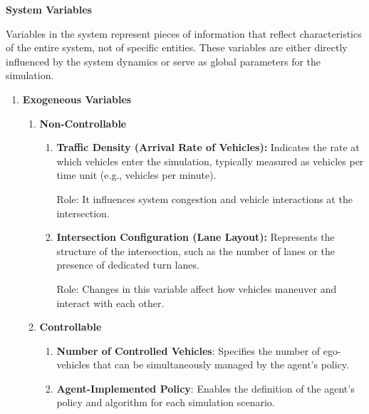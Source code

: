 \textbf{System Variables}

Variables in the system represent pieces of information that reflect characteristics of the entire system, not of specific entities. These variables are either directly influenced by the system dynamics or serve as global parameters for the simulation.

\begin{enumerate}

    \item \textbf{Exogeneous Variables}
    \begin{enumerate}
        \item\textbf{Non-Controllable}
            \begin{enumerate}
          
            \item \textbf{Traffic Density (Arrival Rate of Vehicles):}
                Indicates the rate at which vehicles enter the simulation, typically measured as vehicles per time unit (e.g., vehicles per minute).
                
                Role: It influences system congestion and vehicle interactions at the intersection.
                
            \item \textbf{Intersection Configuration (Lane Layout):}
                Represents the structure of the intersection, such as the number of lanes or the presence of dedicated turn lanes.
                
                Role: Changes in this variable affect how vehicles maneuver and interact with each other.
            \end{enumerate}  

        \item \textbf{Controllable}  
            \begin{enumerate}
                \item \textbf{Number of Controlled Vehicles}:  
                Specifies the number of ego-vehicles that can be simultaneously managed by the agent's policy.  

                \item \textbf{Agent-Implemented Policy}:  
                Enables the definition of the agent's policy and algorithm for each simulation scenario.  
            \end{enumerate}

    \end{enumerate}


\end{enumerate}
